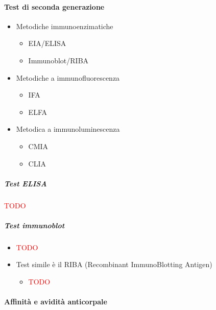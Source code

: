 \documentclass[italian,]{article}
\providecommand{\tightlist}{%
  \setlength{\itemsep}{0pt}\setlength{\parskip}{0pt}}
\newcommand{\TODO}[1]{\textcolor{red}{\textsf{\footnotesize{TODO #1}}}} %
\begin{document}
\hypertarget{test-di-seconda-generazione}{%
\paragraph{Test di seconda
generazione}\label{test-di-seconda-generazione}}

\begin{itemize}
\tightlist
\item
  Metodiche immunoenzimatiche

  \begin{itemize}
  \tightlist
  \item
    EIA/ELISA
  \item
    Immunoblot/RIBA
  \end{itemize}
\item
  Metodiche a immunofluorescenza

  \begin{itemize}
  \tightlist
  \item
    IFA
  \item
    ELFA
  \end{itemize}
\item
  Metodica a immunoluminescenza

  \begin{itemize}
  \tightlist
  \item
    CMIA
  \item
    CLIA
  \end{itemize}
\end{itemize}

\hypertarget{test-elisa}{%
\subparagraph{Test ELISA}\label{test-elisa}}

\TODO{}

\hypertarget{test-immunoblot}{%
\subparagraph{Test immunoblot}\label{test-immunoblot}}

\begin{itemize}
\item
  \TODO{}
\item
  Test simile è il RIBA (Recombinant ImmunoBlotting Antigen)

  \begin{itemize}
  \item
    \TODO{}
  \end{itemize}
\end{itemize}

\hypertarget{affinituxe0-e-avidituxe0-anticorpale}{%
\paragraph{Affinità e avidità
anticorpale}\label{affinituxe0-e-avidituxe0-anticorpale}}
\end{document}
